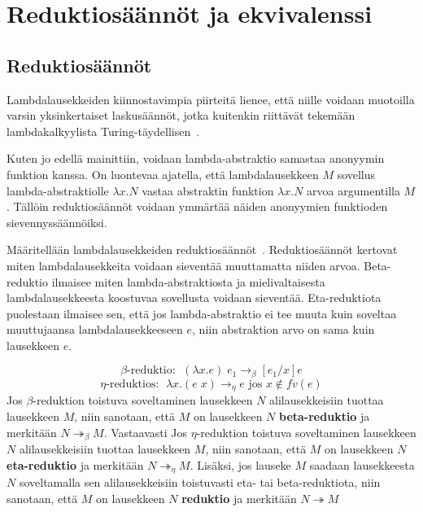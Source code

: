 \section{Reduktiosäännöt ja ekvivalenssi}

\subsection{Reduktiosäännöt}
Lambdalausekkeiden kiinnostavimpia piirteitä lienee, että niille voidaan muotoilla varsin yksinkertaiset laskusäännöt, jotka kuitenkin riittävät tekemään lambdakalkyylista Turing-täydellisen~\cite[liite]{Turing36}.  
\par
Kuten jo edellä mainittiin, voidaan lambda-abstraktio samastaa anonyymin funktion kanssa. On luontevaa ajatella, että lambdalausekkeen $M$ sovellus lambda-abstraktiolle $\lambda x . N$ vastaa abstraktin funktion $\lambda x . N$ arvoa argumentilla $M$. Tällöin reduktiosäännöt voidaan ymmärtää näiden anonyymien funktioden sievennyssäännöiksi.
\par
Määritellään lambdalausekkeiden reduktiosäännöt~\cite[s.~9]{Hudak89}. Reduktiosäännöt kertovat miten lambdalausekkeita voidaan sieventää muuttamatta niiden arvoa. Beta-reduktio ilmaisee miten lambda-abstraktiosta ja mielivaltaisesta lambdalausekkeesta koostuvaa sovellusta voidaan sieventää. Eta-reduktiota puolestaan ilmaisee sen, että jos lambda-abstraktio ei tee muuta kuin soveltaa muuttujaansa lambdalausekkeeseen $e$, niin abstraktion arvo on sama kuin lausekkeen $e$.    

\begin{maar}[reduktiosäännöt]	
\[\beta \text{-reduktio: } \; (\lambda x.e )\; e_{1} \rightarrow_{\beta} [e_{1} / x]e \]
\[\eta \text{-reduktios: } \; \lambda x.(e \; x) \rightarrow_{\eta} e \text{ jos } x \notin fv(e) \]	
Jos $\beta$-reduktion toistuva soveltaminen lausekkeen $N$ alilausekkeisiin tuottaa lausekkeen $M$, niin sanotaan, että $M$ on lausekkeen $N$ \textbf{beta-reduktio} ja merkitään $N  \twoheadrightarrow_{\beta} M$. Vastaavasti Jos $\eta$-reduktion toistuva soveltaminen lausekkeen $N$ alilausekkeisiin tuottaa lausekkeen $M$, niin sanotaan, että $M$ on lausekkeen $N$ \textbf{eta-reduktio} ja merkitään $N  \twoheadrightarrow_{\eta} M$. Lisäksi, jos lauseke $M$ saadaan lausekkeesta $N$ soveltamalla sen alilausekkeisiin toistuvasti eta- tai beta-reduktiota, niin sanotaan, että $M$ on lausekkeen $N$ \textbf{reduktio} ja merkitään $N  \twoheadrightarrow M$        
\end{maar}

